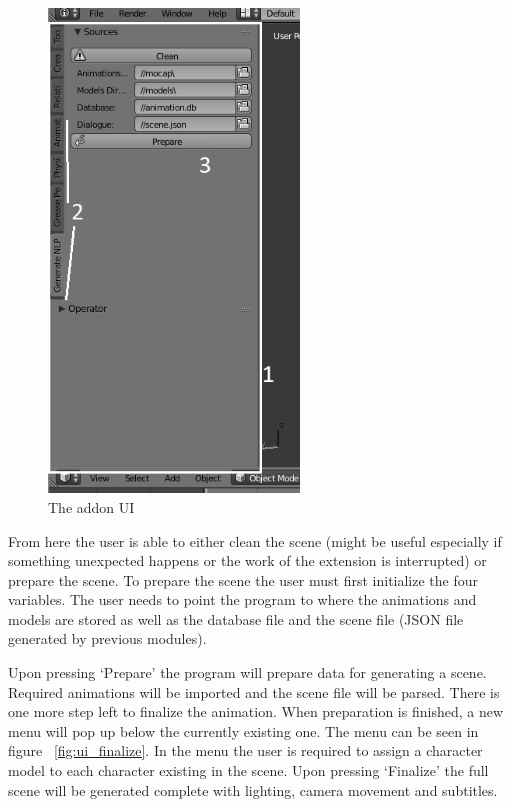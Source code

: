 \begin{figure}[H]
\centerline{\includegraphics[width = 18em]{img/ui_main.png}}
\caption{The addon UI}\label{fig:ui_main}
\end{figure}

From here the user is able to either clean the scene (might be useful especially if something unexpected happens or the work of the extension is interrupted) or prepare the scene. To prepare the scene the user must first initialize the four variables. The user needs to point the program to where the animations and models are stored as well as the database file and the scene file (JSON file generated by previous modules).

Upon pressing `Prepare' the program will prepare data for generating a scene. Required animations will be imported and the scene file will be parsed. There is one more step left to finalize the animation. When preparation is finished, a new menu will pop up below the currently existing one. The menu can be seen in figure ~\ref{fig:ui_finalize}. In the menu the user is required to assign a character model to each character existing in the scene. Upon pressing `Finalize' the full scene will be generated complete with lighting, camera movement and subtitles.

